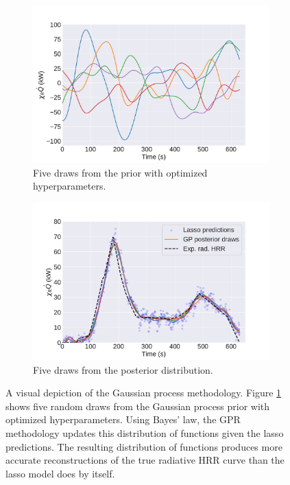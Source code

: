 \documentclass{article}
\begin{document}
\begin{figure}[htbp]
  \centering
  \begin{subfigure}[t]{.45\textwidth}
      \centering
      \includegraphics[width=\textwidth,keepaspectratio]{figures/gp_prior.pdf}
      \caption{Five draws from the prior with optimized hyperparameters.}
      \label{fig:gp_prior}
  \end{subfigure}
  \begin{subfigure}[t]{.45\textwidth}
      \centering
      \includegraphics[width=\textwidth ,keepaspectratio]{figures/gp_posterior.pdf}
      \caption{Five draws from the posterior distribution.}
      \label{fig:gp_posterior}
  \end{subfigure}
  \caption{A visual depiction of the Gaussian process methodology. Figure \protect\ref{fig:gp_prior} shows five random draws from the Gaussian process prior with optimized hyperparameters. Using Bayes' law, the GPR methodology updates this distribution of functions given the lasso predictions. The resulting distribution of functions produces more accurate reconstructions of the true radiative HRR curve than the lasso model does by itself.} 
  \label{fig:gp_regression_example}
\end{figure}
\end{document}
